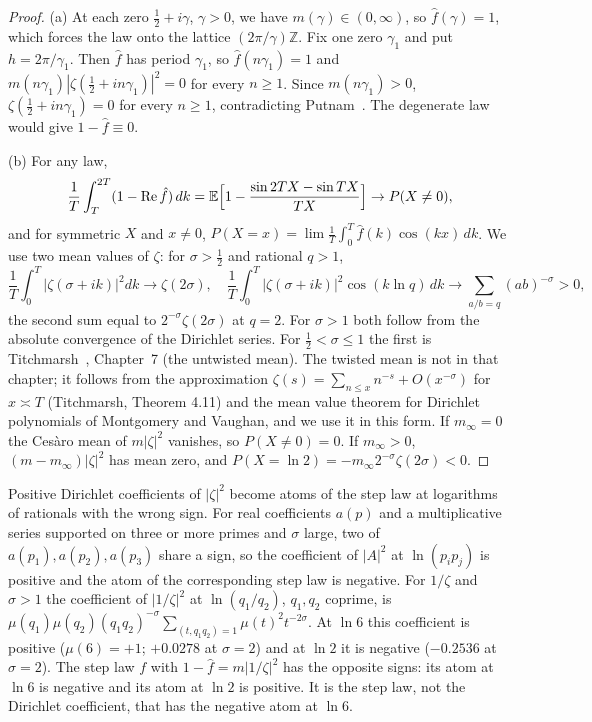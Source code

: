 \begin{proof}
(a) At each zero $\frac12+i\gamma$, $\gamma>0$, we have $m(\gamma)\in(0,\infty)$, so $\hat f(\gamma)=1$, which forces the law onto the lattice $(2\pi/\gamma)\mathbb Z$. Fix one zero $\gamma_1$ and put $h=2\pi/\gamma_1$. Then $\hat f$ has period $\gamma_1$, so $\hat f(n\gamma_1)=1$ and $m(n\gamma_1)|\zeta(\frac12+in\gamma_1)|^2=0$ for every $n\ge1$. Since $m(n\gamma_1)>0$, $\zeta(\frac12+in\gamma_1)=0$ for every $n\ge1$, contradicting Putnam~\cite{Putnam54}. The degenerate law would give $1-\hat f\equiv0$.

(b) For any law,
\[
\frac1T\int_T^{2T}(1-\operatorname{Re}\hat f)\,dk=\mathbb{E}\Big[1-\frac{\sin2TX-\sin TX}{TX}\Big]\to P(X\ne0),
\]
and for symmetric $X$ and $x\ne0$, $P(X=x)=\lim\frac1T\int_0^T\hat f(k)\cos(kx)\,dk$. We use two mean values of $\zeta$: for $\sigma>\frac12$ and rational $q>1$,
\begin{equation}\label{cw:eq:twisted}
\frac1T\int_0^T|\zeta(\sigma+ik)|^2dk\to\zeta(2\sigma),\quad
\frac1T\int_0^T|\zeta(\sigma+ik)|^2\cos(k\ln q)\,dk\to\sum_{a/b=q}(ab)^{-\sigma}>0,
\end{equation}
the second sum equal to $2^{-\sigma}\zeta(2\sigma)$ at $q=2$. For $\sigma>1$ both follow from the absolute convergence of the Dirichlet series. For $\frac12<\sigma\le1$ the first is Titchmarsh~\cite{Titchmarsh}, Chapter~7 (the untwisted mean). The twisted mean is not in that chapter; it follows from the approximation $\zeta(s)=\sum_{n\le x}n^{-s}+O(x^{-\sigma})$ for $x\asymp T$ (Titchmarsh, Theorem 4.11) and the mean value theorem for Dirichlet polynomials of Montgomery and Vaughan, and we use it in this form.
If $m_\infty=0$ the Ces\`aro mean of $m|\zeta|^2$ vanishes, so $P(X\ne0)=0$. If $m_\infty>0$, $(m-m_\infty)|\zeta|^2$ has mean zero, and $P(X=\ln2)=-m_\infty2^{-\sigma}\zeta(2\sigma)<0$.
\end{proof}

\begin{remark}
Positive Dirichlet coefficients of $|\zeta|^2$ become atoms of the step law at logarithms of rationals with the wrong sign. For real coefficients $a(p)$ and a multiplicative series supported on three or more primes and $\sigma$ large, two of $a(p_1),a(p_2),a(p_3)$ share a sign, so the coefficient of $|A|^2$ at $\ln(p_ip_j)$ is positive and the atom of the corresponding step law is negative. For $1/\zeta$ and $\sigma>1$ the coefficient of $|1/\zeta|^2$ at $\ln(q_1/q_2)$, $q_1,q_2$ coprime, is $\mu(q_1)\mu(q_2)(q_1q_2)^{-\sigma}\sum_{(t,q_1q_2)=1}\mu(t)^2t^{-2\sigma}$. At $\ln6$ this coefficient is positive ($\mu(6)=+1$; $+0.0278$ at $\sigma=2$) and at $\ln2$ it is negative ($-0.2536$ at $\sigma=2$). The step law $f$ with $1-\hat f=m|1/\zeta|^2$ has the opposite signs: its atom at $\ln6$ is negative and its atom at $\ln2$ is positive. It is the step law, not the Dirichlet coefficient, that has the negative atom at $\ln6$.
\end{remark}

